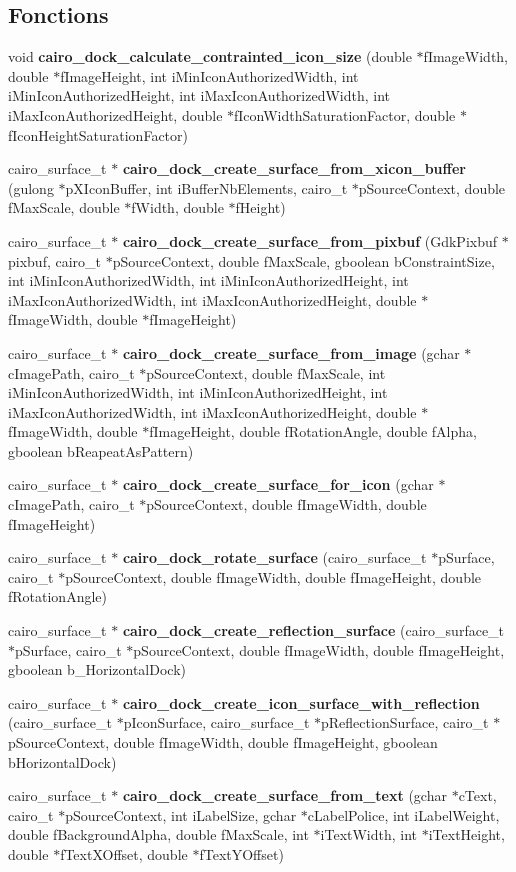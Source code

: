 \subsection*{Fonctions}
\begin{CompactItemize}
\item 
void {\bf cairo\_\-dock\_\-calculate\_\-contrainted\_\-icon\_\-size} (double $\ast$fImageWidth, double $\ast$fImageHeight, int iMinIconAuthorizedWidth, int iMinIconAuthorizedHeight, int iMaxIconAuthorizedWidth, int iMaxIconAuthorizedHeight, double $\ast$fIconWidthSaturationFactor, double $\ast$fIconHeightSaturationFactor)
\item 
cairo\_\-surface\_\-t $\ast$ {\bf cairo\_\-dock\_\-create\_\-surface\_\-from\_\-xicon\_\-buffer} (gulong $\ast$pXIconBuffer, int iBufferNbElements, cairo\_\-t $\ast$pSourceContext, double fMaxScale, double $\ast$fWidth, double $\ast$fHeight)
\item 
cairo\_\-surface\_\-t $\ast$ {\bf cairo\_\-dock\_\-create\_\-surface\_\-from\_\-pixbuf} (GdkPixbuf $\ast$pixbuf, cairo\_\-t $\ast$pSourceContext, double fMaxScale, gboolean bConstraintSize, int iMinIconAuthorizedWidth, int iMinIconAuthorizedHeight, int iMaxIconAuthorizedWidth, int iMaxIconAuthorizedHeight, double $\ast$fImageWidth, double $\ast$fImageHeight)
\item 
cairo\_\-surface\_\-t $\ast$ {\bf cairo\_\-dock\_\-create\_\-surface\_\-from\_\-image} (gchar $\ast$cImagePath, cairo\_\-t $\ast$pSourceContext, double fMaxScale, int iMinIconAuthorizedWidth, int iMinIconAuthorizedHeight, int iMaxIconAuthorizedWidth, int iMaxIconAuthorizedHeight, double $\ast$fImageWidth, double $\ast$fImageHeight, double fRotationAngle, double fAlpha, gboolean bReapeatAsPattern)
\item 
cairo\_\-surface\_\-t $\ast$ {\bf cairo\_\-dock\_\-create\_\-surface\_\-for\_\-icon} (gchar $\ast$cImagePath, cairo\_\-t $\ast$pSourceContext, double fImageWidth, double fImageHeight)
\item 
cairo\_\-surface\_\-t $\ast$ {\bf cairo\_\-dock\_\-rotate\_\-surface} (cairo\_\-surface\_\-t $\ast$pSurface, cairo\_\-t $\ast$pSourceContext, double fImageWidth, double fImageHeight, double fRotationAngle)
\item 
cairo\_\-surface\_\-t $\ast$ {\bf cairo\_\-dock\_\-create\_\-reflection\_\-surface} (cairo\_\-surface\_\-t $\ast$pSurface, cairo\_\-t $\ast$pSourceContext, double fImageWidth, double fImageHeight, gboolean b\_\-HorizontalDock)
\item 
cairo\_\-surface\_\-t $\ast$ {\bf cairo\_\-dock\_\-create\_\-icon\_\-surface\_\-with\_\-reflection} (cairo\_\-surface\_\-t $\ast$pIconSurface, cairo\_\-surface\_\-t $\ast$pReflectionSurface, cairo\_\-t $\ast$pSourceContext, double fImageWidth, double fImageHeight, gboolean bHorizontalDock)
\item 
cairo\_\-surface\_\-t $\ast$ {\bf cairo\_\-dock\_\-create\_\-surface\_\-from\_\-text} (gchar $\ast$cText, cairo\_\-t $\ast$pSourceContext, int iLabelSize, gchar $\ast$cLabelPolice, int iLabelWeight, double fBackgroundAlpha, double fMaxScale, int $\ast$iTextWidth, int $\ast$iTextHeight, double $\ast$fTextXOffset, double $\ast$fTextYOffset)
\end{CompactItemize}


